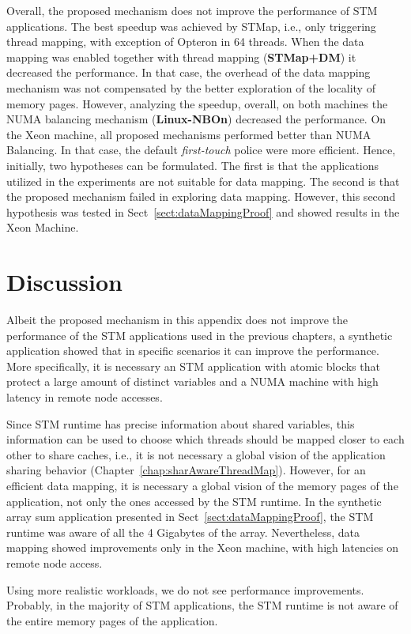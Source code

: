 Overall, the proposed mechanism does not improve the performance of STM applications. The best speedup was achieved by STMap, i.e., only triggering thread mapping, with exception of Opteron in 64 threads. When the data mapping was enabled together with thread mapping (\textbf{STMap+DM}) it decreased the performance. In that case, the overhead of the data mapping mechanism was not compensated by the better exploration of the locality of memory pages. However, analyzing the speedup, overall, on both machines the NUMA balancing mechanism (\textbf{Linux-NBOn}) decreased the performance. On the Xeon machine, all proposed mechanisms performed better than NUMA Balancing. In that case, the default \emph{first-touch} police were more efficient. Hence, initially, two hypotheses can be formulated. The first is that the applications utilized in the experiments are not suitable for data mapping. The second is that the proposed mechanism failed in exploring data mapping. However, this second hypothesis was tested in Sect~\ref{sect:dataMappingProof} and showed results in the Xeon Machine.

\section{Discussion}\label{sect:DataMappingDiscussion}

Albeit the proposed mechanism in this appendix does not improve the performance of the STM applications used in the previous chapters, a synthetic application showed that in specific scenarios it can improve the performance. More specifically, it is necessary an STM application with atomic blocks that protect a large amount of distinct variables and a NUMA machine with high latency in remote node accesses.

Since STM runtime has precise information about shared variables, this information can be used to choose which threads should be mapped closer to each other to share caches, i.e., it is not necessary a global vision of the application sharing behavior (Chapter~\ref{chap:sharAwareThreadMap}). However, for an efficient data mapping, it is necessary a global vision of the memory pages of the application, not only the ones accessed by the STM runtime. In the synthetic array sum application presented in Sect~\ref{sect:dataMappingProof}, the STM runtime was aware of all the 4 Gigabytes of the array. Nevertheless, data mapping showed improvements only in the Xeon machine, with high latencies on remote node access.

Using more realistic workloads, we do not see performance improvements. Probably, in the majority of STM applications, the STM runtime is not aware of the entire memory pages of the application. 


